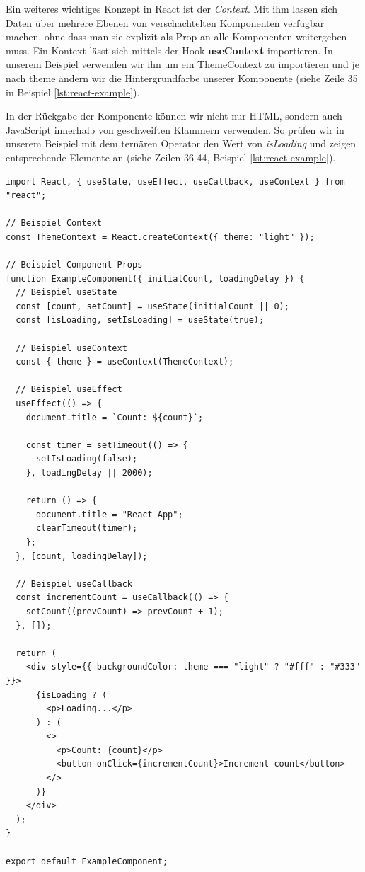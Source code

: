 \documentclass[a4paper,12pt]{report}
\begin{document}
Ein weiteres wichtiges Konzept in React ist der \textit{Context}. Mit ihm lassen sich Daten über mehrere Ebenen von verschachtelten Komponenten verfügbar machen, ohne dass man sie explizit als Prop an alle Komponenten weitergeben muss. Ein Kontext lässt sich mittels der Hook \textbf{useContext} importieren. In unserem Beispiel verwenden wir ihn um ein ThemeContext zu importieren und je nach theme ändern wir die Hintergrundfarbe unserer Komponente (siehe Zeile 35 in Beispiel \ref{lst:react-example}).

In der Rückgabe der Komponente können wir nicht nur HTML, sondern auch JavaScript innerhalb von geschweiften Klammern verwenden. So prüfen wir in unserem Beispiel mit dem ternären Operator den Wert von \textit{isLoading} und zeigen entsprechende Elemente an (siehe Zeilen 36-44, Beispiel \ref{lst:react-example}).
\begin{lstlisting}[style=codeStyle, caption={Beispiel einer React Komponente}, label={lst:react-example}]
import React, { useState, useEffect, useCallback, useContext } from "react";

// Beispiel Context
const ThemeContext = React.createContext({ theme: "light" });

// Beispiel Component Props
function ExampleComponent({ initialCount, loadingDelay }) {
  // Beispiel useState
  const [count, setCount] = useState(initialCount || 0);
  const [isLoading, setIsLoading] = useState(true);

  // Beispiel useContext
  const { theme } = useContext(ThemeContext);

  // Beispiel useEffect
  useEffect(() => {
    document.title = `Count: ${count}`;

    const timer = setTimeout(() => {
      setIsLoading(false);
    }, loadingDelay || 2000);

    return () => {
      document.title = "React App";
      clearTimeout(timer);
    };
  }, [count, loadingDelay]);
  
  // Beispiel useCallback
  const incrementCount = useCallback(() => {
    setCount((prevCount) => prevCount + 1);
  }, []);

  return (
    <div style={{ backgroundColor: theme === "light" ? "#fff" : "#333" }}>
      {isLoading ? (
        <p>Loading...</p>
      ) : (
        <>
          <p>Count: {count}</p>
          <button onClick={incrementCount}>Increment count</button>
        </>
      )}
    </div>
  );
}

export default ExampleComponent;
\end{lstlisting}
\end{document}
